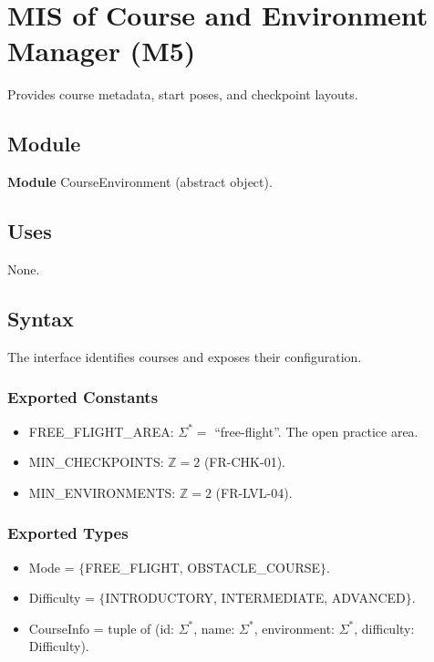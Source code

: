 \documentclass[12pt, titlepage]{article}
\begin{document}
\section{MIS of Course and Environment Manager (M5)} \label{sec:M5}

Provides course metadata, start poses, and checkpoint layouts.

\subsection{Module}

\textbf{Module} CourseEnvironment (abstract object).

\subsection{Uses}

None.

\subsection{Syntax}

The interface identifies courses and exposes their configuration.

\subsubsection{Exported Constants}

\begin{itemize}
\item FREE\_FLIGHT\_AREA: $\Sigma^* =$ ``free-flight''. The open practice area.
\item MIN\_CHECKPOINTS: $\mathbb{Z} = 2$ (FR-CHK-01).
\item MIN\_ENVIRONMENTS: $\mathbb{Z} = 2$ (FR-LVL-04).
\end{itemize}

\subsubsection{Exported Types}

\begin{itemize}
\item Mode = $\{$FREE\_FLIGHT, OBSTACLE\_COURSE$\}$.
\item Difficulty = $\{$INTRODUCTORY, INTERMEDIATE, ADVANCED$\}$.
\item CourseInfo = tuple of (id: $\Sigma^*$, name: $\Sigma^*$, environment:
  $\Sigma^*$, difficulty: Difficulty).
\end{itemize}
\end{document}
